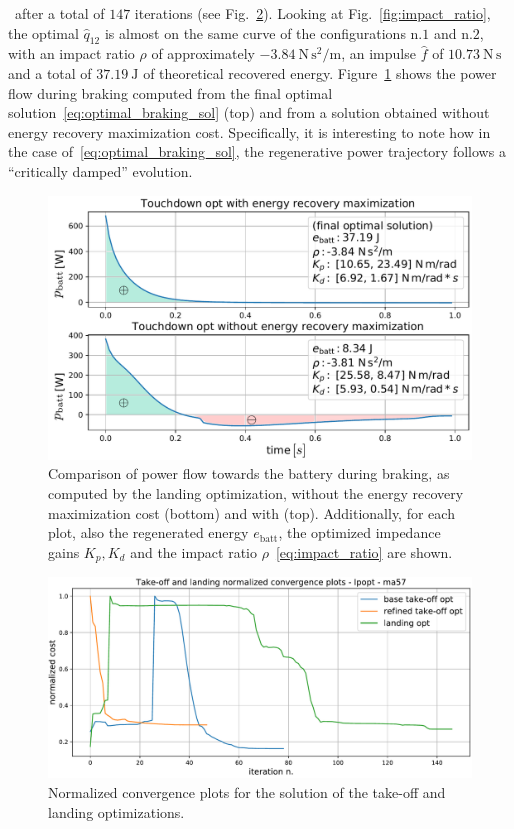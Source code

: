 ~\hspace{-0.55cm}after a total of $147$ iterations (see Fig.~\ref{fig:convergence_plots}). Looking at Fig.~\ref{fig:impact_ratio}, the optimal $\hat{q}_{12}$ is almost on the same curve of the configurations n.$1$ and n.$2$, with an impact ratio $\rho$ of approximately $-3.84~\mathrm{N\,s^{2}/m}$, an impulse $\hat{f}$ of $10.73~\mathrm{N\,s}$ and a total of $37.19~\mathrm{J}$ of theoretical recovered energy. Figure~\ref{fig:critically_damped_pow} shows the power flow during braking computed from the final optimal solution~\eqref{eq:optimal_braking_sol} (top) and from a solution obtained without energy recovery maximization cost. Specifically, it is interesting to note how in the case of~\eqref{eq:optimal_braking_sol}, the regenerative power trajectory follows a \enquote{critically damped} evolution. 
\begin{figure}[h]
	\centering
	\includegraphics[width=1\columnwidth]{images/critically_damped_vs_no_reg_pow_max.pdf}
	\caption{Comparison of power flow towards the battery during braking, as computed by the landing optimization, without the energy recovery maximization cost (bottom) and with (top). Additionally, for each plot, also the regenerated energy $e_{\mathrm{batt}}$, the optimized impedance gains $K_p, K_d$ and the impact ratio $\rho$~\eqref{eq:impact_ratio} are shown.}
	\label{fig:critically_damped_pow}
\end{figure}
\begin{figure}[t]
	\centering
	\includegraphics[width=1\columnwidth]{images/solver_conv_plots.pdf}
	\caption{Normalized convergence plots for the solution of the take-off and landing optimizations.}
	\label{fig:convergence_plots}
\end{figure}
